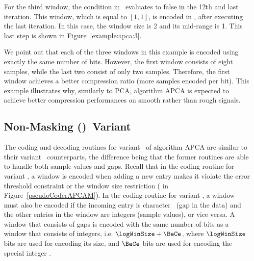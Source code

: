 For the third window, the condition in \Line \APCACodeOne\ evaluates to false in the 12th and last iteration. This window, which is equal to $[1, 1]$, is encoded in \Line \APCACodeTwo, after executing the last iteration. In this case, the window size is 2 and its mid-range is 1. This last step is shown in Figure~\ref{example:apca:3}.


\vspace{+5pt}


We point out that each of the three windows in this example is encoded using exactly the same number of bits. However, the first window consists of eight samples, while the last two consist of only two samples. Therefore, the first window achieves a better compression ratio (more samples encoded per bit). This example illustrates why, similarly to PCA, algorithm APCA is expected to achieve better compression performances on smooth rather than rough signals.




\clearpage
\subsection{Non-Masking (\NOmaskalgo)\ Variant}
\label{algo:apca:nmvariant}


The coding and decoding routines for variant \NOmaskalgo\ of algorithm APCA are similar to their variant \maskalgo\ counterparts, the difference being that the former routines are able to handle both sample values and gaps. Recall that in the coding routine for variant \maskalgo, a window is encoded when adding a new entry makes it violate the error threshold constraint or the window size restriction ( in Figure~\ref{pseudoCoderAPCAM}). In the coding routine for variant \NOmaskalgo, a window must also be encoded if the incoming entry is character \noData\ (gap in the data) and the other entries in the window are integers (sample values), or vice versa. A window that consists of gaps is encoded with the same number of bits as a window that consists of integers, i.e. $\logWinSize+\BeCe$, where $\logWinSize$ bits are used for encoding its size, and $\BeCe$ bits are used for encoding the special integer \nodata.

